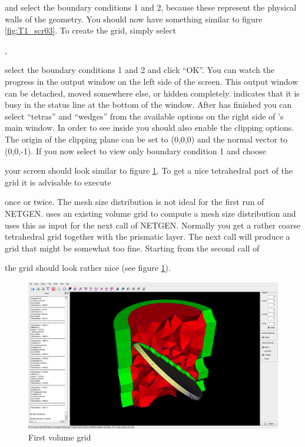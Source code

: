  
and select the boundary conditions 1 and 2, because these represent the physical walls of the geometry. You should now have something similar to figure \ref{fig:T1_scr03}. To create the grid, simply select

, 

select the boundary conditions 1 and 2 and click {}``OK''. You can watch the progress in the output window on the left side of the screen. This output window can be detached, moved somewhere else, or hidden completely. \eg indicates that it is busy in the status line at the bottom of the window. After \eg has finished you can select {}``tetras'' and {}``wedges'' from
the available options on the right side of \eg's main window. In order to see inside you should also enable the clipping options. The origin of the clipping plane can be set to (0,0,0) and the normal vector to (0,0,-1). If you now select to view only boundary condition 1 and choose

 
your screen should look similar to figure \ref{fig:T1_scr04}. To get a nice tetrahedral part of the grid it is advisable to execute


once or twice. The mesh size distribution is not ideal for the first run of NETGEN. \eg uses an existing volume grid to compute a mesh size distribution and uses this as input for the next call of NETGEN. Normally you get a rather coarse tetrahedral grid together with the prismatic layer. The next call will produce a grid that might be somewhat too fine. Starting from the second call of

 
the grid should look rather nice (see figure \ref{fig:T1_scr04}).

\begin{figure}
  \begin{centering}
    \includegraphics[width=14cm]{figures/tutorials/T1/scr04}
    \par
  \end{centering}
  \caption{First volume grid}
  \label{fig:T1_scr04}
\end{figure}

